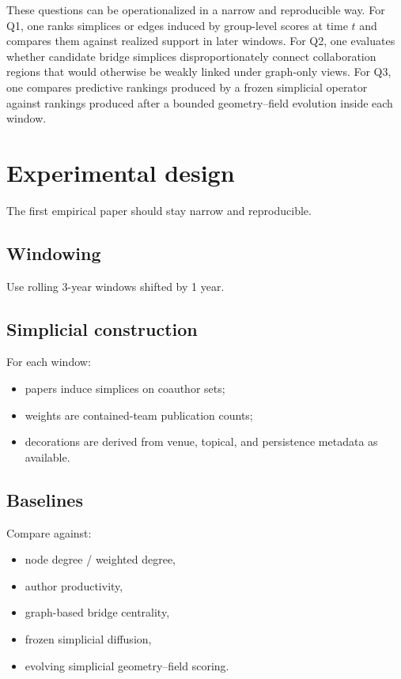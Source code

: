 \documentclass[11pt]{article}
\begin{document}
These questions can be operationalized in a narrow and reproducible way. For Q1, one ranks simplices or edges induced by group-level scores at time $t$ and compares them against realized support in later windows. For Q2, one evaluates whether candidate bridge simplices disproportionately connect collaboration regions that would otherwise be weakly linked under graph-only views. For Q3, one compares predictive rankings produced by a frozen simplicial operator against rankings produced after a bounded geometry--field evolution inside each window.

\section{Experimental design}
The first empirical paper should stay narrow and reproducible.

\subsection*{Windowing}
Use rolling 3-year windows shifted by 1 year.

\subsection*{Simplicial construction}
For each window:
\begin{itemize}
    \item papers induce simplices on coauthor sets;
    \item weights are contained-team publication counts;
    \item decorations are derived from venue, topical, and persistence metadata as available.
\end{itemize}

\subsection*{Baselines}
Compare against:
\begin{itemize}
    \item node degree / weighted degree,
    \item author productivity,
    \item graph-based bridge centrality,
    \item frozen simplicial diffusion,
    \item evolving simplicial geometry--field scoring.
\end{itemize}
\end{document}
